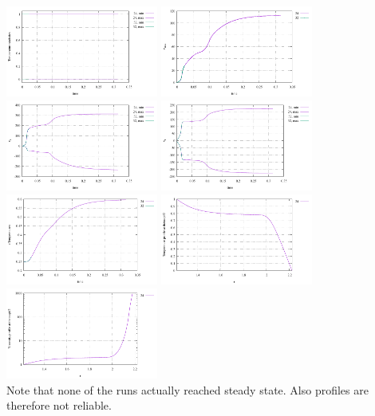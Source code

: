 \begin{center}
\includegraphics[width=5cm]{python_codes/fieldstone_106/results/exp3/stats_T.pdf}
\includegraphics[width=5cm]{python_codes/fieldstone_106/results/exp3/vrms.pdf}\\
\includegraphics[width=5cm]{python_codes/fieldstone_106/results/exp3/stats_vr.pdf}
\includegraphics[width=5cm]{python_codes/fieldstone_106/results/exp3/stats_vt.pdf}\\
\includegraphics[width=5cm]{python_codes/fieldstone_106/results/exp3/Tavrg.pdf}
\includegraphics[width=5cm]{python_codes/fieldstone_106/results/exp3/profile_T.pdf}\\
\includegraphics[width=5cm]{python_codes/fieldstone_106/results/exp3/profile_eta.pdf}\\
{\captionfont Note that none of the runs actually reached steady state. Also 
profiles are therefore not reliable.} 
\end{center}

